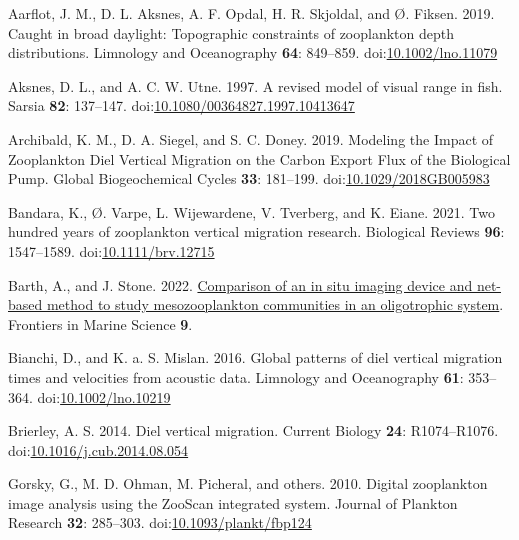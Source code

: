 \documentclass[
]{article}
\newlength{\cslhangindent}
\newlength{\cslentryspacingunit} %
\newenvironment{CSLReferences}[2] %
 {%
  \setlength{\parindent}{0pt}
  \ifodd #1
  \let\oldpar\par
  \def\par{\hangindent=\cslhangindent\oldpar}
  \fi
  \setlength{\parskip}{#2\cslentryspacingunit}
 }%
 {}
\begin{document}
\hypertarget{refs}{}
\begin{CSLReferences}{1}{0}
\leavevmode{}%
Aarflot, J. M., D. L. Aksnes, A. F. Opdal, H. R. Skjoldal, and Ø.
Fiksen. 2019. Caught in broad daylight: Topographic constraints of
zooplankton depth distributions. Limnology and Oceanography \textbf{64}:
849--859.
doi:\href{https://doi.org/10.1002/lno.11079}{10.1002/lno.11079}

\leavevmode{}%
Aksnes, D. L., and A. C. W. Utne. 1997. A revised model of visual range
in fish. Sarsia \textbf{82}: 137--147.
doi:\href{https://doi.org/10.1080/00364827.1997.10413647}{10.1080/00364827.1997.10413647}

\leavevmode{}%
Archibald, K. M., D. A. Siegel, and S. C. Doney. 2019. Modeling the
Impact of Zooplankton Diel Vertical Migration on the Carbon Export Flux
of the Biological Pump. Global Biogeochemical Cycles \textbf{33}:
181--199.
doi:\href{https://doi.org/10.1029/2018GB005983}{10.1029/2018GB005983}

\leavevmode{}%
Bandara, K., Ø. Varpe, L. Wijewardene, V. Tverberg, and K. Eiane. 2021.
Two hundred years of zooplankton vertical migration research. Biological
Reviews \textbf{96}: 1547--1589.
doi:\href{https://doi.org/10.1111/brv.12715}{10.1111/brv.12715}

\leavevmode{}%
Barth, A., and J. Stone. 2022.
\href{https://www.frontiersin.org/articles/10.3389/fmars.2022.898057}{Comparison
of an in situ imaging device and net-based method to study
mesozooplankton communities in an oligotrophic system}. Frontiers in
Marine Science \textbf{9}.

\leavevmode{}%
Bianchi, D., and K. a. S. Mislan. 2016. Global patterns of diel vertical
migration times and velocities from acoustic data. Limnology and
Oceanography \textbf{61}: 353--364.
doi:\href{https://doi.org/10.1002/lno.10219}{10.1002/lno.10219}

\leavevmode{}%
Brierley, A. S. 2014. Diel vertical migration. Current Biology
\textbf{24}: R1074--R1076.
doi:\href{https://doi.org/10.1016/j.cub.2014.08.054}{10.1016/j.cub.2014.08.054}

\leavevmode{}%
Gorsky, G., M. D. Ohman, M. Picheral, and others. 2010. Digital
zooplankton image analysis using the ZooScan integrated system. Journal
of Plankton Research \textbf{32}: 285--303.
doi:\href{https://doi.org/10.1093/plankt/fbp124}{10.1093/plankt/fbp124}


\end{CSLReferences}
\end{document}
